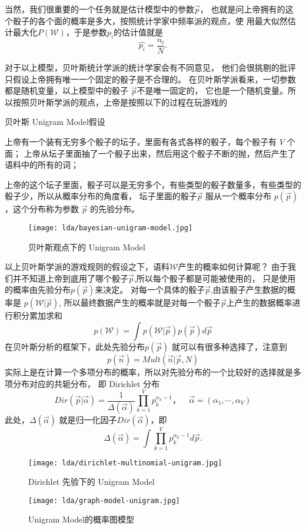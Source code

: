 当然，我们很重要的一个任务就是估计模型中的参数$\vec{p}$，
也就是问上帝拥有的这个骰子的各个面的概率是多大，按照统计学家中频率派的观点，使
用最大似然估计最大化$P(\mathcal{W})$，于是参数$p_i$的估计值就是
$$ \hat{p_i} = \frac{n_i}{N} .$$

对于以上模型，贝叶斯统计学派的统计学家会有不同意见，
他们会很挑剔的批评只假设上帝拥有唯一一个固定的骰子是不合理的。
在贝叶斯学派看来，一切参数都是随机变量，以上模型中的骰子 $\vec{p}$不是唯一固定的，
它也是一个随机变量。所以按照贝叶斯学派的观点，上帝是按照以下的过程在玩游戏的
\begin{algorithm}[H]
\caption{贝叶斯 Unigram Model假设}
\begin{algorithmic}[1]
\STATE 上帝有一个装有无穷多个骰子的坛子，里面有各式各样的骰子，每个骰子有 $V$ 个面；
\STATE 上帝从坛子里面抽了一个骰子出来，然后用这个骰子不断的抛，然后产生了语料中的所有的词；
\end{algorithmic}
\end{algorithm}
上帝的这个坛子里面，骰子可以是无穷多个，有些类型的骰子数量多，有些类型的骰子少，所以从概率分布的角度看，
坛子里面的骰子$\vec{p}$ 服从一个概率分布 $p(\vec{p})$，这个分布称为参数
$\vec{p}$ 的先验分布。

\begin{figure}[htbp]
\centering
\texttt{[image: lda/bayesian-unigram-model.jpg]}
\caption{贝叶斯观点下的 Unigram Model}
\end{figure}

以上贝叶斯学派的游戏规则的假设之下，语料$\mathcal{W}$产生的概率如何计算呢？
由于我们并不知道上帝到底用了哪个骰子$\vec{p}$,所以每个骰子都是可能被使用的，
只是使用的概率由先验分布$p(\vec{p})$来决定。
对每一个具体的骰子$\vec{p}$,由该骰子产生数据的概率是 $p(\mathcal{W}|\vec{p})$,
所以最终数据产生的概率就是对每一个骰子$\vec{p}$上产生的数据概率进行积分累加求和
$$ p(\mathcal{W}) = \int p(\mathcal{W}|\vec{p}) p(\vec{p})d\vec{p} $$
在贝叶斯分析的框架下，此处先验分布$p(\vec{p})$ 就可以有很多种选择了，注意到
$$ p(\vec{n}) = Mult(\vec{n}|\vec{p}, N) $$ 实际上是在计算一个多项分布的概率，所以对先验分布的一个比较好的选择就是多项分布对应的共轭分布，
即 Dirichlet 分布
$$ Dir(\vec{p}|\vec{\alpha})=
\frac{1}{\Delta(\vec{\alpha})} \prod_{k=1}^V p_k^{\alpha_k -1}，
\quad \vec{\alpha}=(\alpha_1, \cdots, \alpha_V) $$
此处，$\Delta(\vec{\alpha})$ 就是归一化因子$Dir(\vec{\alpha})$，即
$$ \Delta(\vec{\alpha}) =
\int \prod_{k=1}^V p_k^{\alpha_k -1} d\vec{p} . $$

\begin{figure}[htbp]
\centering
\texttt{[image: lda/dirichlet-multinomial-unigram.jpg]}
\caption{Dirichlet 先验下的 Unigram Model}
\end{figure}
\begin{figure}[htbp]
\centering
\texttt{[image: lda/graph-model-unigram.jpg]}
\caption{Unigram Model的概率图模型}
\end{figure}

